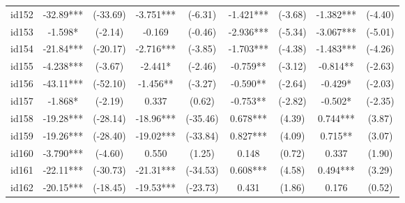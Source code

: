 \documentclass[entropy,article,submit,moreauthors,LaTeX and dvi2pdf]{Definitions/mdpi}
\begin{document}
\begin{center}
\begin{longtable}{ccccccccc}
id152                                         & -32.89***     & (-33.69)      & -3.751***       & (-6.31)          & -1.421***         & (-3.68)           & -1.382***         & (-4.40)           \\
id153                                         & -1.598*       & (-2.14)       & -0.169          & (-0.46)          & -2.936***         & (-5.34)           & -3.067***         & (-5.01)           \\
id154                                         & -21.84***     & (-20.17)      & -2.716***       & (-3.85)          & -1.703***         & (-4.38)           & -1.483***         & (-4.26)           \\
id155                                         & -4.238***     & (-3.67)       & -2.441*         & (-2.46)          & -0.759**          & (-3.12)           & -0.814**          & (-2.63)           \\
id156                                         & -43.11***     & (-52.10)      & -1.456**        & (-3.27)          & -0.590**          & (-2.64)           & -0.429*           & (-2.03)           \\
id157                                         & -1.868*       & (-2.19)       & 0.337           & (0.62)           & -0.753**          & (-2.82)           & -0.502*           & (-2.35)           \\
id158                                         & -19.28***     & (-28.14)      & -18.96***       & (-35.46)         & 0.678***          & (4.39)            & 0.744***          & (3.87)            \\
id159                                         & -19.26***     & (-28.40)      & -19.02***       & (-33.84)         & 0.827***          & (4.09)            & 0.715**           & (3.07)            \\
id160                                         & -3.790***     & (-4.60)       & 0.550           & (1.25)           & 0.148             & (0.72)            & 0.337             & (1.90)            \\
id161                                         & -22.11***     & (-30.73)      & -21.31***       & (-34.53)         & 0.608***          & (4.58)            & 0.494***          & (3.29)            \\
id162                                         & -20.15***     & (-18.45)      & -19.53***       & (-23.73)         & 0.431             & (1.86)            & 0.176             & (0.52)            \\

\end{longtable}
\end{center}
\end{document}
